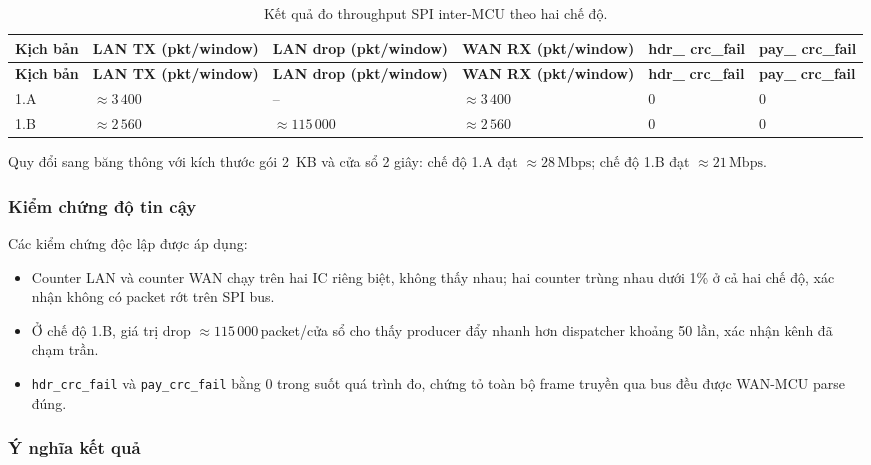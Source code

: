 \begin{longtable}{|p{1cm}|p{2.75cm}|p{2.75cm}|p{2.75cm}|p{1.75cm}|p{1.75cm}|}
    \caption{Kết quả đo throughput SPI inter-MCU theo hai chế độ.}
    \label{tab:spi_results} \\
    \hline
    \textbf{Kịch bản} & \textbf{LAN TX (pkt/window)} & \textbf{LAN drop (pkt/window)} & \textbf{WAN RX (pkt/window)} & \textbf{hdr\_} \newline \textbf{crc\_fail} & \textbf{pay\_} \newline \textbf{crc\_fail} \\ \hline
    \endfirsthead
    \hline
    \textbf{Kịch bản} & \textbf{LAN TX (pkt/window)} & \textbf{LAN drop (pkt/window)} & \textbf{WAN RX (pkt/window)} & \textbf{hdr\_} \newline \textbf{crc\_fail} & \textbf{pay\_} \newline \textbf{crc\_fail} \\ \hline
    \endhead
    \hline
    \endfoot
    \endlastfoot
    1.A & $\approx 3\,400$ & -- & $\approx 3\,400$ & 0 & 0 \\ \hline
    1.B  & $\approx 2\,560$ & $\approx 115\,000$ & $\approx 2\,560$ & 0 & 0 \\ \hline
\end{longtable}

Quy đổi sang băng thông với kích thước gói 2~KB và cửa sổ 2 giây: chế độ 1.A đạt $\approx 28\,\text{Mbps}$; chế độ 1.B đạt $\approx 21\,\text{Mbps}$.

\subsubsection{Kiểm chứng độ tin cậy}

Các kiểm chứng độc lập được áp dụng:
\begin{itemize}
    \item Counter LAN và counter WAN chạy trên hai IC riêng biệt, không thấy nhau; hai counter trùng nhau dưới 1\% ở cả hai chế độ, xác nhận không có packet rớt trên SPI bus.
    \item Ở chế độ 1.B, giá trị drop $\approx 115\,000$\,packet/cửa sổ cho thấy producer đẩy nhanh hơn dispatcher khoảng 50 lần, xác nhận kênh đã chạm trần.
    \item \texttt{hdr\_crc\_fail} và \texttt{pay\_crc\_fail} bằng 0 trong suốt quá trình đo, chứng tỏ toàn bộ frame truyền qua bus đều được WAN-MCU parse đúng.
\end{itemize}

\subsubsection{Ý nghĩa kết quả}


